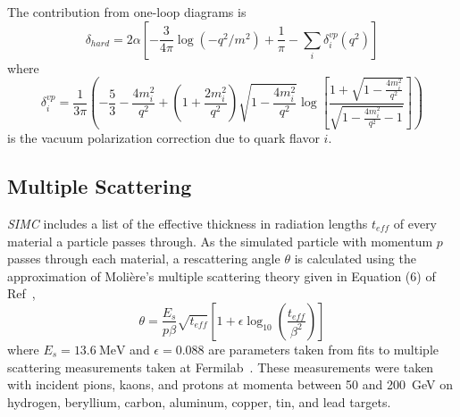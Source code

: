 The contribution from one-loop diagrams is
\begin{equation}
    \delta_{hard} = 2\alpha \left[ -\frac{3}{4\pi}\log(-q^2/m^2) +
    \frac{1}{\pi} - \sum_i \delta^{vp}_i(q^2)\right]
\end{equation}
where
\begin{equation}
    \delta^{vp}_i = \frac{1}{3 \pi}
                        \left(
                            -\frac{5}{3} - \frac{4 m_{i}^{2}}{q^{2}} +
                            \left(1+\frac{2 m_{i}^{2}}{q^{2}}\right)
                            \sqrt{1-\frac{4 m_{i}^{2}}{q^{2}}}
                            \log \left[\frac{1+\sqrt{1-\frac{4 m_{i}^{2}}{q^{2}}}}
                                            {\sqrt{1-\frac{4 m_{i}^{2}}{q^{2}}-1}}
                                 \right]
                        \right)
\end{equation}
is the vacuum polarization correction due to quark flavor $i$.

\subsection{Multiple Scattering}

\textit{SIMC} includes a list of the effective thickness in radiation lengths
$t_{eff}$ of every material a particle passes through.
As the simulated particle with momentum $p$ passes through each material, a
rescattering angle $\theta$ is calculated using the approximation of
Moli\`{e}re's multiple scattering theory given in Equation (6) of
Ref~\cite{Lynch_1991},
\begin{equation}
    \theta = \frac{E_s}{p \beta}
             \sqrt{t_{eff}}
             \left[1 + \epsilon \log_{10}{\left( \frac{t_{eff}}{\beta^2} \right)}\right]
\end{equation}
where $E_s=\SI{13.6}{\mega\electronvolt}$ and $\epsilon=0.088$ are parameters
taken from fits to multiple scattering measurements taken at
Fermilab~\cite{Shen_1979}.
These measurements were taken with incident pions, kaons, and protons at
momenta between 50 and \SI{200}{\giga\electronvolt} on hydrogen, beryllium,
carbon, aluminum, copper, tin, and lead targets.

